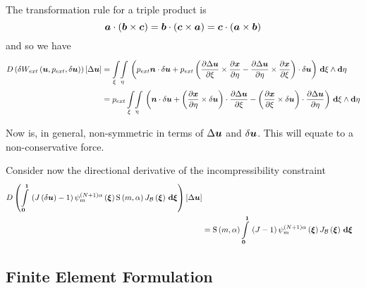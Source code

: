The transformation rule for a triple product is
\begin{equation}
  \boldsymbol{a}\cdot\left( \boldsymbol{b}\times\boldsymbol{c} \right)=
  \boldsymbol{b}\cdot\left( \boldsymbol{c}\times\boldsymbol{a} \right)=
  \boldsymbol{c}\cdot\left( \boldsymbol{a}\times\boldsymbol{b} \right)
\end{equation}
and so we have
\begin{equation}
  \begin{split}
    \directionalderiv{\fnof{\delta
        W_{ext}}{\vectr{u},p_{ext},\delta\vectr{u}}}{\Delta\vectr{u}}&=\giint{\xi}{}{\eta}{}{\pbrac{\dotprod{p_{ext}\vectr{n}}{\delta\vectr{u}}+
        \dotprod{p_{ext}\pbrac{\crossprod{\delby{\Delta\vectr{u}}{\xi}}{\delby{\vectr{x}}{\eta}}-
            \crossprod{\delby{\Delta\vectr{u}}{\eta}}{\delby{\vectr{x}}{\xi}}}}{\delta\vectr{u}}}}{\xi}{\eta}\\
    &=p_{ext}\giint{\xi}{}{\eta}{}{\pbrac{\dotprod{\vectr{n}}{\delta\vectr{u}}+
        \dotprod{\pbrac{\crossprod{\delby{\vectr{x}}{\eta}}{\delta\vectr{u}}}}{\delby{\Delta\vectr{u}}{\xi}}-
        \dotprod{\pbrac{\crossprod{\delby{\vectr{x}}{\xi}}{\delta\vectr{u}}}}{\delby{\Delta\vectr{u}}{\eta}}}}{\xi}{\eta}
  \end{split}
  \label{eqn:nonsympressuredirectderiv}
\end{equation}

Now  is, in general, non-symmetric in terms of
$\Delta \boldsymbol{u}$ and $\delta\boldsymbol{u}$. This will equate to a
non-conservative force. 

Consider now the directional derivative of the incompressibility constraint \ie
\begin{equation}
  \begin{split}
       D\left(   \displaystyle\int\limits_{\boldsymbol{0}}^{\boldsymbol{1}} \,\left(  J\left( \delta\boldsymbol{u} \right) -1 \right)
           \psi_{m}^{\left( N+1 \right)\alpha} \left( \boldsymbol{\xi} \right)     \mathrm{S} \left( m,\alpha \right)   J_{ \mathcal{B} }\left( \boldsymbol{\xi} \right) \, \boldsymbol{\mathrm{d}} \boldsymbol{\xi}  \right) \left[ \Delta\boldsymbol{u} \right]  
    \\ &=   \mathrm{S} \left( m,\alpha \right)    \displaystyle\int\limits_{\boldsymbol{0}}^{\boldsymbol{1}} \,\left( J-1 \right)   \psi_{m}^{\left( N+1 \right)\alpha} \left( \boldsymbol{\xi} \right)  
       J_{ \mathcal{B} }\left( \boldsymbol{\xi} \right) \, \boldsymbol{\mathrm{d}} \boldsymbol{\xi} 
  \end{split}
\end{equation}

\subsection{Finite Element Formulation}

